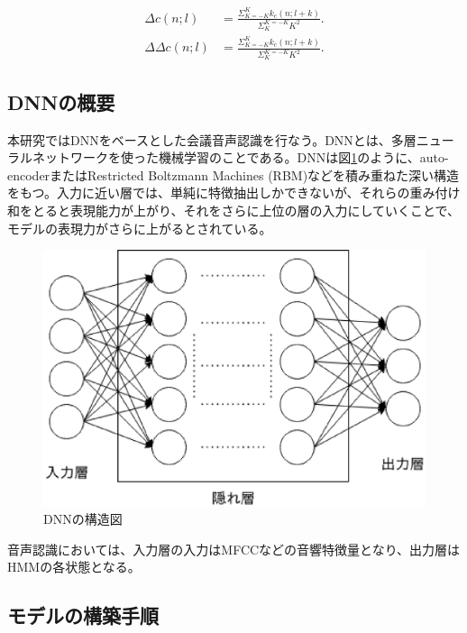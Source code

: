 {{\begin{align}
\Delta c(n;l) &= \frac{\Sigma_{K=-K}^{K}k_c(n;l+k)}{\Sigma_{K}^{K=-K}K^2}. \label{eq:deltac} \\
\Delta\Delta c(n;l) &= \frac{\Sigma_{K=-K}^{K}k_c(n;l+k)}{\Sigma_{K}^{K=-K}K^2}. \label{eq:deltadeltac}
\end{align}

\subsection{DNNの概要\cite{audio_textbook}}
本研究ではDNNをベースとした会議音声認識を行なう。DNNとは、多層ニューラルネットワークを使った機械学習のことである。DNNは図\ref{fig:dnn}のように、auto-encoderまたはRestricted Boltzmann Machines (RBM)などを積み重ねた深い構造をもつ。入力に近い層では、単純に特徴抽出しかできないが、それらの重み付け和をとると表現能力が上がり、それをさらに上位の層の入力にしていくことで、モデルの表現力がさらに上がるとされている。\par

\begin{figure}[H]
  \begin{center}
    \includegraphics[scale=0.5]{./figure/structure_dnn.eps}
  \end{center}
  \caption{DNNの構造図}
  \label{fig:dnn}
\end{figure}

音声認識においては、入力層の入力はMFCCなどの音響特徴量となり、出力層はHMMの各状態となる。

\subsection{モデルの構築手順}}}\par
